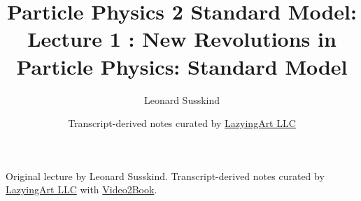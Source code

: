 \documentclass[11pt,oneside]{book}
\begin{document}
\frontmatter
\title{Particle Physics 2 Standard Model: Lecture 1 : New Revolutions in Particle Physics: Standard Model}
\author{Leonard Susskind}
\date{Transcript-derived notes curated by \href{https://lazying.art}{LazyingArt LLC}}
\maketitle
\begin{center}
\small Original lecture by Leonard Susskind. Transcript-derived notes curated by \href{https://lazying.art}{LazyingArt LLC} with \href{https://github.com/lachlanchen/Video2Book}{Video2Book}.
\end{center}
\clearpage
\mainmatter

\end{document}
